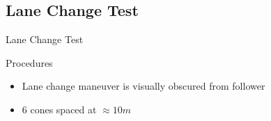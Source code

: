 \documentclass{beamer}
\begin{document}
  \subsection{Lane Change Test}

    \begin{frame}{Lane Change Test}
    \end{frame}

    \begin{frame}{Procedures}
      \begin{figure}
        
      \end{figure}
      \begin{itemize}
        \item Lane change maneuver is visually obscured from follower 
        \item 6 cones spaced at $\approx10m$
      \end{itemize}
    \end{frame}
    
\end{document}
